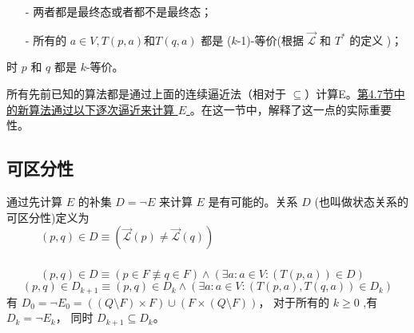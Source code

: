 \begin{itemize}
    \item [-] 两者都是最终态或者都不是最终态；
    \item [-] 所有的 $a\in V,T(p,a) \mbox{和} T(q,a)$ 都是 ($k$-1)-等价(根据 $\overrightarrow{\mathcal{L}}$ 和 $T^*$ 的定义  )；
\end{itemize}
时 $p$ 和 $q$ 都是 $k$-等价。
\newline


所有先前已知的算法都是通过上面的连续逼近法（相对于 $\subseteq$）计算E。\uline{第4.7节中的新算法通过以下逐次逼近来计算 $E$ }。在这一节中，解释了这一点的实际重要性。



\subsection{可区分性}
通过先计算 $E$ 的补集 $D=\neg E$ 来计算 $E$ 是有可能的。关系 $D$ (也叫做状态关系的可区分性)定义为 \\
\mbox{　　　}$ (p,q) \in D \equiv (\overrightarrow{\mathcal{L}}(p) \not=\overrightarrow{\mathcal{L}}(q)) $\\

 \\
\mbox{　　　}$ (p,q)\in D \equiv (p \in F \not\equiv q \in F) \land (\exists a:a \in V : (T(p,a)) \in D) $\\

$$ (p,q) \in D_{k+1} \equiv (p,q) \in D_k \land ( \exists a:a \in V : (T (p,a),T(q,a))\in D_k)$$
有 $D_0 = \neg E_0 = ( (Q \setminus F) \times F) \cup ( F \times ( Q \setminus F))$， 对于所有的 $k \ge 0$ ,有 $D_k = \neg E_k$， 同时 $D_{k+1} \subseteq D_k $。

